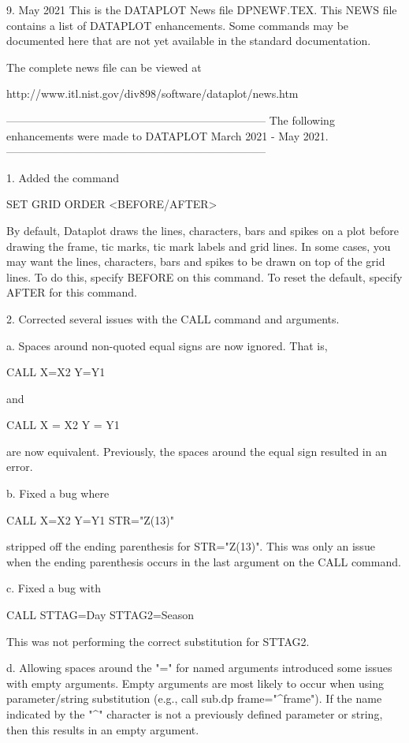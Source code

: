 9.
                                                     May   2021
This is the DATAPLOT News file DPNEWF.TEX.  This NEWS file contains a
list of DATAPLOT enhancements.  Some commands may be documented here
that are not yet available in the standard documentation.

The complete news file can be viewed at

    http://www.itl.nist.gov/div898/software/dataplot/news.htm

-----------------------------------------------------------------------
The following enhancements were made to DATAPLOT
March 2021 - May 2021.
-----------------------------------------------------------------------

 1. Added the command

      SET GRID ORDER <BEFORE/AFTER>

    By default, Dataplot draws the lines, characters, bars and
    spikes on a plot before drawing the frame, tic marks, tic mark
    labels and grid lines.  In some cases, you may want the lines,
    characters, bars and spikes to be drawn on top of the grid lines.
    To do this, specify BEFORE on this command.  To reset the default,
    specify AFTER for this command.

 2. Corrected several issues with the CALL command and arguments.

    a. Spaces around non-quoted equal signs are now ignored.  That is,

           CALL X=X2 Y=Y1

        and

           CALL X = X2 Y = Y1

        are now equivalent.  Previously, the spaces around the equal
        sign resulted in an error.

    b. Fixed a bug where

           CALL X=X2 Y=Y1 STR="Z(13)"

       stripped off the ending parenthesis for STR="Z(13)".  This was
       only an issue when the ending parenthesis occurs in the last
       argument on the CALL command.

    c. Fixed a bug with

           CALL STTAG=Day STTAG2=Season

        This was not performing the correct substitution for STTAG2.

     d. Allowing spaces around the "=" for named arguments introduced
        some issues with empty arguments.  Empty arguments are most
        likely to occur when using parameter/string substitution
        (e.g., call sub.dp frame="^frame").  If the name indicated by
        the "^" character is not a previously defined parameter or
        string, then this results in an empty argument.

